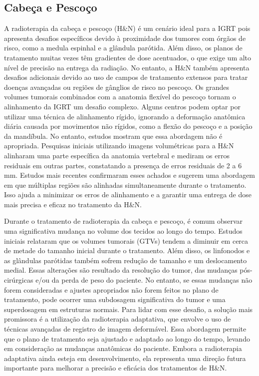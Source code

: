 \documentclass[11pt,a4paper]{article}
\begin{document}
\subsection*{Cabeça e Pescoço}

	A radioterapia da cabeça e pescoço (H\&N) é um cenário ideal para a IGRT pois apresenta desafios específicos devido à proximidade dos tumores com órgãos de risco, como a medula espinhal e a glândula parótida. Além disso, os planos de tratamento muitas vezes têm gradientes de dose acentuados, o que exige um alto nível de precisão na entrega da radiação. No entanto, a H\&N também apresenta desafios adicionais devido ao uso de campos de tratamento extensos para tratar doenças avançadas ou regiões de gânglios de risco no pescoço. Os grandes volumes tumorais combinados com a anatomia flexível do pescoço tornam o alinhamento da IGRT um desafio complexo. Alguns centros podem optar por utilizar uma técnica de alinhamento rígido, ignorando a deformação anatômica diária causada por movimentos não rígidos, como a flexão do pescoço e a posição da mandíbula. No entanto, estudos mostram que essa abordagem não é apropriada. Pesquisas iniciais utilizando imagens volumétricas para a H\&N alinharam uma parte específica da anatomia vertebral e mediram os erros residuais em outras partes, constatando a presença de erros residuais de 2 a 6 mm. Estudos mais recentes confirmaram esses achados e sugerem uma abordagem em que múltiplas regiões são alinhadas simultaneamente durante o tratamento. Isso ajuda a minimizar os erros de alinhamento e a garantir uma entrega de dose mais precisa e eficaz no tratamento da H\&N.

	Durante o tratamento de radioterapia da cabeça e pescoço, é comum observar uma significativa mudança no volume dos tecidos ao longo do tempo. Estudos iniciais relataram que os volumes tumorais (GTVs) tendem a diminuir em cerca de metade do tamanho inicial durante o tratamento. Além disso, os linfonodos e as glândulas parótidas também sofrem redução de tamanho e um deslocamento medial. Essas alterações são resultado da resolução do tumor, das mudanças pós-cirúrgicas e/ou da perda de peso do paciente. No entanto, se essas mudanças não forem consideradas e ajustes apropriados não forem feitos no plano de tratamento, pode ocorrer uma subdosagem significativa do tumor e uma superdosagem em estruturas normais. Para lidar com esse desafio, a solução mais promissora é a utilização da radioterapia adaptativa, que envolve o uso de técnicas avançadas de registro de imagem deformável. Essa abordagem permite que o plano de tratamento seja ajustado e adaptado ao longo do tempo, levando em consideração as mudanças anatômicas do paciente. Embora a radioterapia adaptativa ainda esteja em desenvolvimento, ela representa uma direção futura importante para melhorar a precisão e eficácia dos tratamentos de H\&N.
\end{document}
